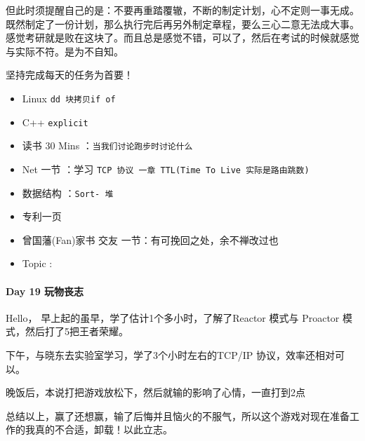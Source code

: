 \documentclass[UTF8,a4paper,8pt]{ctexart}
\begin{document}
	 	 但此时须提醒自己的是：不要再重踏覆辙，不断的制定计划，心不定则一事无成。既然制定了一份计划，那么执行完后再另外制定章程，要么三心二意无法成大事。感觉考研就是败在这块了。而且总是感觉不错，可以了，然后在考试的时候就感觉与实际不符。是为不自知。
	 	 
	 	 坚持完成每天的任务为首要！
	 	 
	 	 \begin{itemize}[itemindent = 1em]
	 	 	\renewcommand\labelitemi{\makebox[0pt][l]{$\square$}\hspace{1em}} 
	 	 	\renewcommand\labelitemi{\makebox[0pt][l]{$\square$}\raisebox{.15ex}{\hspace{0.1em}$\checkmark$}}	 	
	 	 	\item   Linux \verb|dd 块拷贝if of|
	 	 	\item   C++   \verb|explicit|
	 	 	
	 	 	\item   读书  30 Mins	：\verb|当我们讨论跑步时讨论什么|
	 	 	\item   Net 一节 ：学习 \verb|TCP 协议 一章 TTL(Time To Live 实际是路由跳数)|	
	 	 	
	 	 	\renewcommand\labelitemi{\makebox[0pt][l]{$\square$}\hspace{1em}} 
	 	 	\item   数据结构 ：\verb|Sort- 堆| 
	 	 	\item   专利一页	
	 	 	
	 	 	\renewcommand\labelitemi{\makebox[0pt][l]{$\square$}\raisebox{.15ex}{\hspace{0.1em}$\checkmark$}}
	 	 	\item   曾国藩(Fan)家书 交友 一节：有可挽回之处，余不禅改过也
	 	 	\item   Topic :
	 	 \end{itemize}
 	 \paragraph{Day 19   玩物丧志   \quad     }
	 	 Hello， 早上起的虽早，学了估计1个多小时，了解了Reactor 模式与 Proactor 模式，然后打了5把王者荣耀。
	 	 
	 	 下午，与晓东去实验室学习，学了3个小时左右的TCP/IP 协议，效率还相对可以。
	 	 
	 	 晚饭后，本说打把游戏放松下，然后就输的影响了心情，一直打到2点
	 	 
	 	 总结以上，赢了还想赢，输了后悔并且恼火的不服气，所以这个游戏对现在准备工作的我真的不合适，卸载！以此立志。
	 	 
\end{document}
